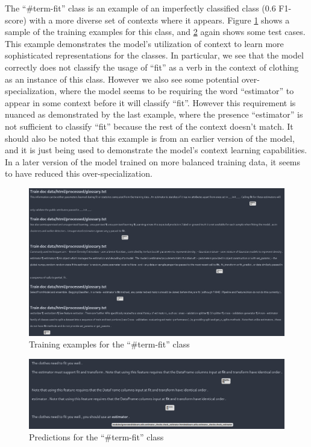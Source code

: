 \documentclass[manuscript,screen,review]{acmart}
\begin{document}
The ``\#term-fit'' class is an example of an imperfectly classified class
(0.6 F1-score) with a more diverse set of contexts where it
appears. Figure \ref{fig:orga486e08} shows a sample of the training
examples for this class, and \ref{fig:org07ffe02} again shows some
test cases. This example demonstrates the model's utilization of
context to learn more sophisticated representations for the
classes. In particular, we see that the model correctly does not
classify the usage of ``fit'' as a verb in the context of clothing as an
instance of this class. However we also see some potential
over-specialization, where the model seems to be requiring the word
``estimator'' to appear in some context before it will classify
``fit''. However this requirement is nuanced as demonstrated by the last
example, where the presence ``estimator'' is not sufficient to classify
``fit'' because the rest of the context doesn't match. It should also be
noted that this example is from an earlier version of the model, and
it is just being used to demonstrate the model's context learning
capabilities. In a later version of the model trained on more balanced
training data, it seems to have reduced this over-specialization.

\begin{figure}[htbp]
\centering
\includegraphics[width=450px]{screenshots/Writeup/2023-04-13_22-20-23_screenshot.png}
\caption{\label{fig:orga486e08}Training examples for the ``\#term-fit'' class}
\end{figure}

\begin{figure}[htbp]
\centering
\includegraphics[width=450px]{screenshots/Writeup/2023-04-13_21-04-54_screenshot.png}
\caption{\label{fig:org07ffe02}Predictions for the ``\#term-fit'' class}
\end{figure}
\end{document}
